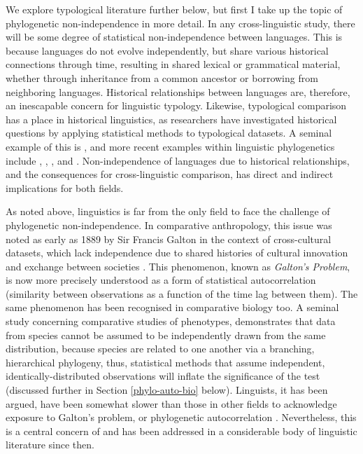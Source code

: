 We explore typological literature further below, but first I take up the topic of phylogenetic non-independence in more detail. In any cross-linguistic study, there will be some degree of statistical non-independence between languages. This is because languages do not evolve independently, but share various historical connections through time, resulting in shared lexical or grammatical material, whether through inheritance from a common ancestor or borrowing from neighboring languages. Historical relationships between languages are, therefore, an inescapable concern for linguistic typology. Likewise, typological comparison has a place in historical linguistics, as researchers have investigated historical questions by applying statistical methods to typological datasets. A seminal example of this is \textcite{nichols_linguistic_1992}, and more recent examples within linguistic phylogenetics include \textcite{dunn_structural_2005}, \textcite{dunn_structural_2008}, \textcite{rexova_cladistic_2006}, \textcite{reesink_explaining_2009} \textcite{sicoli_linguistic_2014} and \textcite{greenhill_evolutionary_2017}. Non-independence of languages due to historical relationships, and the consequences for cross-linguistic comparison, has direct and indirect implications for both fields.

As noted above, linguistics is far from the only field to face the challenge of phylogenetic non-independence. In comparative anthropology, this issue was noted as early as 1889 by Sir Francis Galton in the context of cross-cultural datasets, which lack independence due to shared histories of cultural innovation and exchange between societies \autocite[p.~15]{naroll_two_1961}. This phenomenon, known as \emph{Galton's Problem}, is now more precisely understood as a form of statistical autocorrelation (similarity between observations as a function of the time lag between them). The same phenomenon has been recognised in comparative biology too. A seminal study concerning comparative studies of phenotypes, \textcite{felsenstein_phylogenies_1985} demonstrates that data from species cannot be assumed to be independently drawn from the same distribution, because species are related to one another via a branching, hierarchical phylogeny, thus, statistical methods that assume independent, identically-distributed observations will inflate the significance of the test (discussed further in Section \ref{phylo-auto-bio} below). Linguists, it has been argued, have been somewhat slower than those in other fields to acknowledge exposure to Galton's problem, or phylogenetic autocorrelation \autocite[p.~293]{perkins_statistical_1989}. Nevertheless, this is a central concern of \textcite[p.~259]{dryer_large_1989} and has been addressed in a considerable body of linguistic literature since then.

